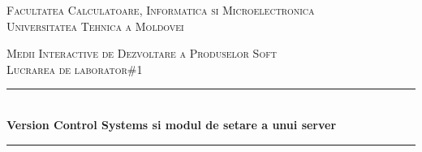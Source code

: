 \documentclass[11pt]{article}
\begin{document}
\begin{titlepage}

  \begin{center} %

  \textsc{\large Facultatea Calculatoare, Informatica si Microelectronica}\\[0.5cm]
  \textsc{\large Universitatea Tehnica a Moldovei}\\[1.2cm] %
  \vspace{25 mm}

  \textsc{\Large Medii Interactive de Dezvoltare a Produselor Soft}\\[0.5cm] %
  \textsc{\large Lucrarea de laborator\#1}\\[0.5cm] %

\newcommand{\HRule}{\rule{\linewidth}{0.5mm}} %

  \vspace{10 mm}
  \HRule \\[0.4cm]
  { \LARGE \bfseries Version Control Systems si modul de setare a unui server  }\\[0.4cm] %
  \HRule \\[1.5cm]

      \vspace{30mm}


\end{center}
\end{titlepage}
\end{document}

